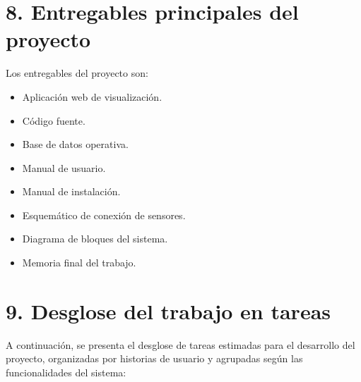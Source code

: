 \documentclass[
11pt, %
]{charter}
\begin{document}
\section{8. Entregables principales del proyecto}
\label{sec:entregables}

Los entregables del proyecto son:

\begin{itemize}
\item Aplicación web de visualización.
\item Código fuente.
\item Base de datos operativa.
\item Manual de usuario.
\item Manual de instalación.
\item Esquemático de conexión de sensores.
\item Diagrama de bloques del sistema.
\item Memoria final del trabajo.

\end{itemize}

\section{9. Desglose del trabajo en tareas}
\label{sec:wbs}

A continuación, se presenta el desglose de tareas estimadas para el desarrollo del proyecto, organizadas por historias de usuario y agrupadas según las funcionalidades del sistema:
\end{document}
